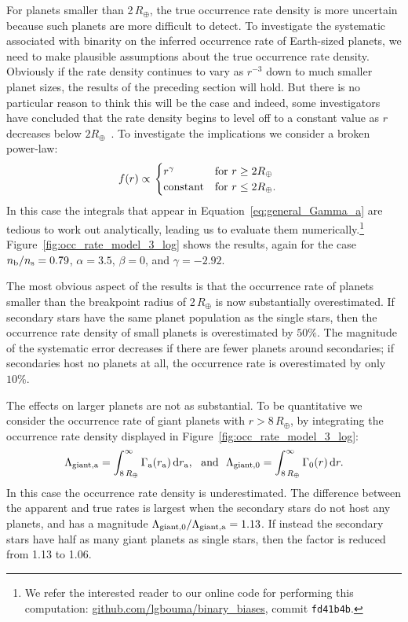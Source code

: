 \documentclass[12pt,modern,trackchanges]{aastex61}
\renewcommand{\a}{_{\rm a}}
\newcommand{\s}{_{\rm s}}
\renewcommand{\b}{_{\rm b}}
\begin{document}
For planets smaller than 2\,$R_\oplus$, the true occurrence rate
density is more uncertain because such planets are more difficult to
detect.  To investigate the systematic  
associated with binarity
on the inferred occurrence rate of Earth-sized planets, we need to
make plausible assumptions about the true occurrence rate density.
Obviously if the rate density continues to vary as $r^{-3}$ down to
much smaller planet sizes, the results of the preceding section will
hold.  But there is no particular reason to think this will be the
case and indeed, some investigators have concluded that the rate
density begins to level off to a constant value as $r$ decreases below
$2R_\oplus$~\citep{petigura_plateau_2013}.  To investigate the
implications we consider a broken power-law:
\begin{align}
    f(r)
    &\propto
    \left.
    \begin{cases}
        r^\gamma & \text{for } r\geq 2R_\oplus \\
        {\rm constant} & \text{for } r\leq2R_\oplus.
    \end{cases}
    \right.
    \label{eq:model3_radius_distribution}
\end{align}
In this case the integrals that appear in
Equation~\ref{eq:general_Gamma_a} are tedious to work out
analytically, leading us to evaluate them numerically.\footnote{We
refer the interested reader to our online code for performing this
computation: \url{github.com/lgbouma/binary_biases}, commit
\texttt{fd41b4b}.} Figure~\ref{fig:occ_rate_model_3_log} shows the
results, again for the case $n\b/n\s=0.79$, $\alpha = 3.5$, $\beta=0$,
and $\gamma=-2.92$.

The most obvious aspect of the results is that the occurrence rate of
planets smaller than the breakpoint radius of 2\,$R_\oplus$ is now
substantially overestimated.  If secondary stars have the same planet
population as the single stars, then the occurrence rate density of
small planets is overestimated by $50\%$.  The magnitude of the
systematic error decreases if there are fewer planets around
secondaries; if secondaries host no planets at all, the occurrence
rate is overestimated by only $10\%$.

The effects on larger planets are not as substantial.  To be
quantitative we consider the occurrence rate of giant planets with
$r>8\,R_\oplus$, by integrating the occurrence rate density displayed
in Figure~\ref{fig:occ_rate_model_3_log}:
\begin{equation}
    \Lambda_{\rm giant,a} =
      \int_{8\,R_\oplus}^{\infty} \Gamma\a(r\a)\,{\rm d}r\a,~~{\rm
      and}~~
    \Lambda_{\rm giant,0} =
      \int_{8\,R_\oplus}^{\infty} \Gamma_0(r)\,{\rm d}r.
\end{equation}
In this case the occurrence rate density is underestimated.  The
difference between the apparent and true rates is largest when the
secondary stars do not host any planets, and has a magnitude
$\Lambda_{{\rm giant},0}/\Lambda_{\rm giant,a} = 1.13$.
If instead the secondary stars have half as many giant planets as single
stars, then the factor is reduced from 1.13 to 1.06.
\end{document}
